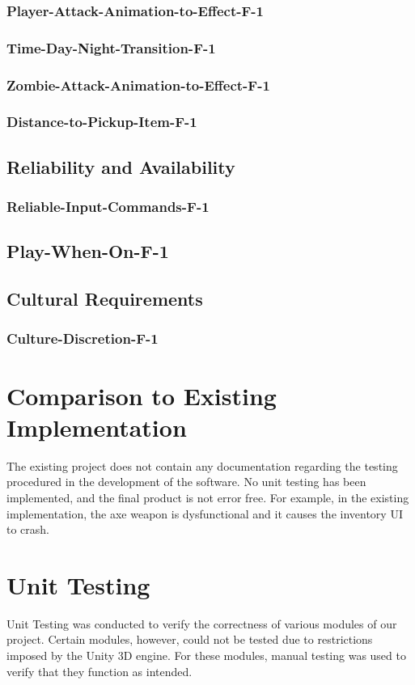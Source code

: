 \documentclass[12pt, titlepage]{article}
\begin{document}
	\subsubsection{Player-Attack-Animation-to-Effect-F-1}
	\subsubsection{Time-Day-Night-Transition-F-1}
	\subsubsection{Zombie-Attack-Animation-to-Effect-F-1}
	\subsubsection{Distance-to-Pickup-Item-F-1}
\subsection{Reliability and Availability}
	\subsubsection{Reliable-Input-Commands-F-1}
	\subsection{Play-When-On-F-1}
\subsection{Cultural Requirements}
	\subsubsection{Culture-Discretion-F-1}
	
\section{Comparison to Existing Implementation}	

The existing project does not contain any documentation regarding the testing procedured in the development of the software. No unit testing has been implemented, and the final product is not error free. For example, in the existing implementation, the axe weapon is dysfunctional and it causes the inventory UI to crash.

\section{Unit Testing}
Unit Testing was conducted to verify the correctness of various modules of our project. Certain modules, however, could not be tested due to restrictions imposed by the Unity 3D engine. For these modules, manual testing was used to verify that they function as intended.
\end{document}
